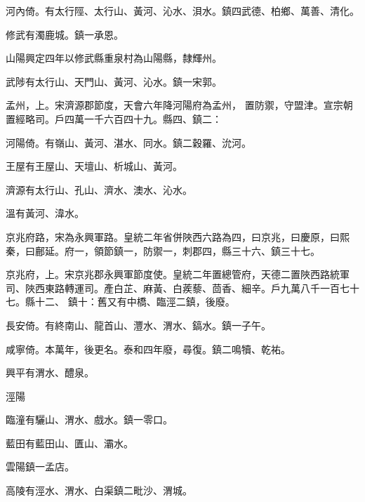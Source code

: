 \begin{pinyinscope}
 河內倚。有太行陘、太行山、黃河、沁水、浿水。鎮四武德、柏鄉、萬善、清化。



 修武有濁鹿城。鎮一承恩。



 山陽興定四年以修武縣重泉村為山陽縣，隸輝州。



 武陟有太行山、天門山、黃河、沁水。鎮一宋郭。



 孟州，上。宋濟源郡節度，天會六年降河陽府為孟州，
 置防禦，守盟津。宣宗朝置經略司。戶四萬一千六百四十九。縣四、鎮二：



 河陽倚。有嶺山、黃河、湛水、同水。鎮二穀羅、沇河。



 王屋有王屋山、天壇山、析城山、黃河。



 濟源有太行山、孔山、濟水、澳水、沁水。



 溫有黃河、湋水。



 京兆府路，宋為永興軍路。皇統二年省併陜西六路為四，曰京兆，曰慶原，曰熙秦，曰鄜延。府一，領節鎮一，防禦一，刺郡四，縣三十六、鎮三十七。



 京兆府，上。宋京兆郡永興軍節度使。皇統二年置總管府，天德二置陜西路統軍司、陜西東路轉運司。產白芷、麻黃、白蒺藜、茴香、細辛。戶九萬八千一百七十七。縣十二、
 鎮十：舊又有中橋、臨涇二鎮，後廢。



 長安倚。有終南山、龍首山、灃水、渭水、鎬水。鎮一子午。



 咸寧倚。本萬年，後更名。泰和四年廢，尋復。鎮二鳴犢、乾祐。



 興平有渭水、醴泉。



 涇陽



 臨潼有驪山、渭水、戲水。鎮一零口。



 藍田有藍田山、匱山、灞水。



 雲陽鎮一孟店。



 高陵有涇水、渭水、白渠鎮二毗沙、渭城。




\end{pinyinscope}
